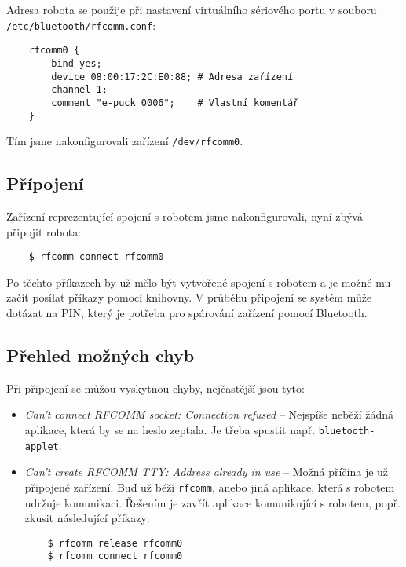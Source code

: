     Adresa robota se použije při nastavení virtuálního sériového portu v
    souboru {\tt /etc/bluetooth/rfcomm.conf}:

    \begin{verbatim}
    rfcomm0 {
        bind yes;
        device 08:00:17:2C:E0:88; # Adresa zařízení
        channel 1;
        comment "e-puck_0006";    # Vlastní komentář
    }
    \end{verbatim}

    Tím jsme nakonfigurovali zařízení {\tt /dev/rfcomm0}.

    \subsection{Přípojení}

    Zařízení reprezentující spojení s robotem jsme nakonfigurovali, nyní zbývá
    připojit robota:

    \begin{verbatim}
    $ rfcomm connect rfcomm0
    \end{verbatim}

    Po těchto příkazech by už mělo být vytvořené spojení s robotem a je možné
    mu začít posílat příkazy pomocí knihovny. V průběhu připojení se systém
    může dotázat na PIN, který je potřeba pro spárování zařízení pomocí
    Bluetooth.

    \subsection{Přehled možných chyb}
    Při připojení se můžou vyskytnou chyby, nejčastější jsou tyto:
    \begin{itemize}
    \item{{\em Can't connect RFCOMM socket: Connection refused} -- Nejspíše
        neběží žádná aplikace, která by se na heslo zeptala. Je třeba spustit
        např. {\tt bluetooth-applet}.}
    \item{{\em Can't create RFCOMM TTY: Address already in use} -- Možná
        příčína je už připojené zařízení. Buď už běží {\tt rfcomm}, anebo jiná
        aplikace, která s robotem udržuje komunikaci. Řešením je zavřít
        aplikace komunikující s robotem, popř. zkusit následující příkazy:
    \begin{verbatim}
    $ rfcomm release rfcomm0
    $ rfcomm connect rfcomm0
    \end{verbatim}
    }
    \end{itemize}

